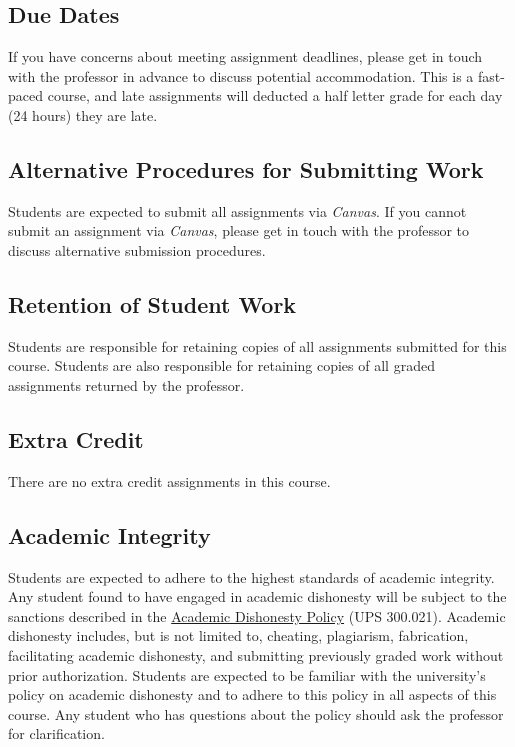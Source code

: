\documentclass[12pt, letterpaper]{article}
\begin{document}
\subsection*{Due Dates}
If you have concerns about meeting assignment deadlines, please get in touch with the professor in advance to discuss potential accommodation. This is a fast-paced course, and late assignments will deducted a half letter grade for each day (24 hours) they are late.

\subsection*{Alternative Procedures for Submitting Work}
Students are expected to submit all assignments via \emph{Canvas}. If you cannot submit an assignment via \emph{Canvas}, please get in touch with the professor to discuss alternative submission procedures.

\subsection*{Retention of Student Work}
Students are responsible for retaining copies of all assignments submitted for this course. Students are also responsible for retaining copies of all graded assignments returned by the professor.

\subsection*{Extra Credit}
There are no extra credit assignments in this course. 

\subsection*{Academic Integrity}
Students are expected to adhere to the highest standards of academic integrity. Any student found to have engaged in academic dishonesty will be subject to the sanctions described in the \href{https://www.fullerton.edu/senate/publications_policies_resolutions/ups/UPS%20300/UPS%20300.021.pdf}{Academic Dishonesty Policy} (UPS 300.021). Academic dishonesty includes, but is not limited to, cheating, plagiarism, fabrication, facilitating academic dishonesty, and submitting previously graded work without prior authorization. Students are expected to be familiar with the university's policy on academic dishonesty and to adhere to this policy in all aspects of this course. Any student who has questions about the policy should ask the professor for clarification.
\end{document}
